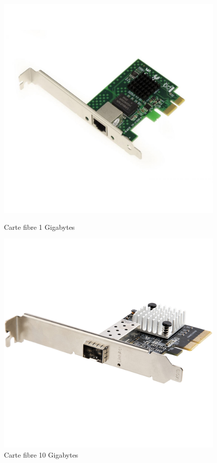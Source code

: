 \documentclass[12pt, a4paper, twoside]{article}
\begin{document}
\begin{figure}[!h]
    \begin{minipage}[b]{0.45\textwidth}
        \centering
        \includegraphics[width=\textwidth,height=\textheight,keepaspectratio]{src/img_carte_1g.jpg}
        \caption{Carte fibre 1 Gigabytes}
        \label{fig:carte_1g}
    \end{minipage}
    \hfill
    \begin{minipage}[b]{0.45\textwidth}
        \centering
        \includegraphics[width=\textwidth,height=\textheight,keepaspectratio]{src/img_carte_10g.jpg}
        \caption{Carte fibre 10 Gigabytes}
        \label{fig:carte_10g}
    \end{minipage}%
\end{figure}
\end{document}
